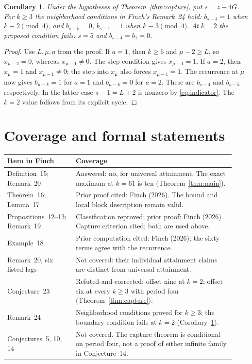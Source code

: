 \documentclass[11pt]{article}
\newtheorem{corollary}[theorem]{Corollary}
\begin{document}
\begin{corollary}\label{cor:neighborhood}
Under the hypotheses of Theorem~\ref{thm:capture}, put $s=z-4G$.
For $k\ge3$ the neighborhood conditions in Finch's Remark~24 hold:
$b_{s-4}=1$ when $k\equiv2\pmod4$, and
$b_{s-5}=0$, $b_{s-1}=1$ when $k\equiv3\pmod4$.
At $k=2$ the proposed condition fails: $s=5$ and $b_{s-4}=b_1=0$.
\end{corollary}
\begin{proof}
Use $L,\mu,a$ from the proof. If $a=1$, then $k\ge6$ and
$\mu-2\ge L$, so $x_{\mu-2}=0$, whereas $x_{\mu-1}\ne0$.
The step condition gives $x_{\mu-1}=1$. If $a=2$, then
$x_\mu=1$ and $x_{\mu-1}\ne0$; the step into $x_\mu$ also
forces $x_{\mu-1}=1$. The recurrence at $\mu$ now gives
$b_{\mu-k}=1$ for $a=1$ and $b_{\mu-k}=0$ for $a=2$.
These are $b_{s-4}$ and $b_{s-5}$ respectively.
In the latter case $s-1=L+2$ is nonzero by
\eqref{eq:indicator}. The $k=2$ value follows from its explicit cycle.
\end{proof}

\section{Coverage and formal statements}
\begin{center}\small
\begin{tabular}{@{}>{\raggedright\arraybackslash}p{0.28\linewidth}>{\raggedright\arraybackslash}p{0.65\linewidth}@{}}
\toprule
Item in Finch \cite{finch2026} & Coverage\\
\midrule
Definition~15; Remark~20 & Answered: no, for universal attainment.
The exact maximum at $k=61$ is ten (Theorem~\ref{thm:main}).\\
Theorem~16; Lemma~17 & Prior proof cited: Finch (2026).
The bound and local block description remain valid.\\
Propositions~12--13; Remark~19 & Classification reproved; prior proof:
Finch (2026). Capture criterion cited; both are used above.\\
Example~18 & Prior computation cited: Finch (2026); the sixty
terms agree with the recurrence.\\
Remark~20, six listed lags & Not covered: their individual attainment
claims are distinct from universal attainment.\\
Conjecture~23 & Refuted-and-corrected: offset nine at $k=2$;
offset six at every $k\ge3$ with period four
(Theorem~\ref{thm:capture}).\\
Remark~24 & Neighborhood conditions proved for $k\ge3$;
the boundary condition fails at $k=2$
(Corollary~\ref{cor:neighborhood}).\\
Conjectures~5, 10, 14 & Not covered. The capture theorem is
conditional on period four, not a proof of either infinite family
in Conjecture~14.\\
\bottomrule
\end{tabular}
\end{center}
\end{document}
